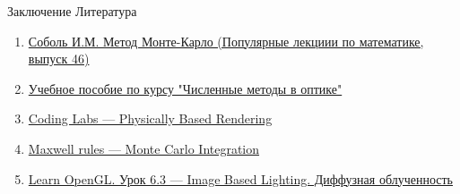 \documentclass{beamer}
\begin{document}
	\begin{frame}{Заключение}
		Литература
		\begin{enumerate}
			\item \href{https://math.ru/lib/plm/46}{Соболь И.М. Метод Монте-Карло (Популярные лекциии по математике, выпуск 46)}
			\item \href{http://aco.ifmo.ru/el_books/numerical_methods/lectures/glava2_2.html}{Учебное пособие по курсу "Численные методы в оптике"}
			\item \href{http://www.codinglabs.net/article_physically_based_rendering.aspx}{Coding Labs --- Physically Based Rendering}
			\item \href{https://www.maxwellrules.com/math/montecarlo_integration.html}{Maxwell rules --- Monte Carlo Integration}
			\item \href{https://habr.com/ru/articles/426987/}{Learn OpenGL. Урок 6.3 --- Image Based Lighting. Диффузная облученность}
			
		\end{enumerate}

	\end{frame}
	
\end{document}
